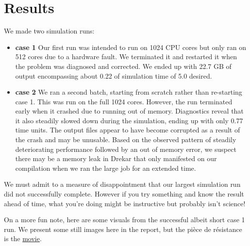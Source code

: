 \documentclass[11pt]{article} %
\begin{document}
\section{Results}
We made two simulation runs:
\begin{itemize}
\item{\textbf{case 1}} Our first run was intended to run on 1024 CPU cores but only ran on 512 cores due to a hardware fault.
We terminated it and restarted it when the problem was diagnosed and corrected.  We ended up with 22.7 GB of output
encompassing about 0.22 of simulation time of 5.0 desired.
\item{\textbf{case 2}} We ran a second batch, starting from scratch rather than re-starting case 1.
This was run on the full 1024 cores.  However, the run terminated early when it crashed due to running out of memory.
Diagnostics reveal that it also steadily slowed down during the simulation, ending up with only 0.77 time units.
The output files appear to have become corrupted as a result of the crash and may be unusable.
Based on the observed pattern of steadily deteriorating performance followed by an out of memory error,
we suspect there may be a memory leak in Drekar that only manifested on our compilation when we ran
the large job for an extended time.
\end{itemize}

We must admit to a measure of disappointment that our largest simulation run did not successfully complete.
However if you try something and know the result ahead of time, 
what you're doing might be instructive but probably isn't science!

On a more fun note, here are some visuals from the successful albeit short case 1 run.
We present some still images here in the report, but the pi\`ece de r\'esistance 
is the \href{https://youtu.be/KJptFoJbmuM}{movie}.

\newpage
\end{document}
